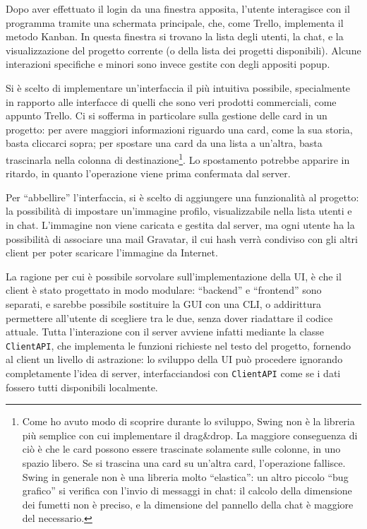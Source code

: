 \documentclass[a4paper,11pt] {article}
\begin{document}
Dopo aver effettuato il login da una finestra apposita, l'utente interagisce con il programma tramite una schermata principale, che, come Trello, implementa il metodo Kanban. In questa finestra si trovano la lista degli utenti, la chat, e la visualizzazione del progetto corrente (o della lista dei progetti disponibili). Alcune interazioni specifiche e minori sono invece gestite con degli appositi popup.

Si è scelto di implementare un'interfaccia il più intuitiva possibile, specialmente in rapporto alle interfacce di quelli che sono veri prodotti commerciali, come appunto Trello. Ci si sofferma in particolare sulla gestione delle card in un progetto: per avere maggiori informazioni riguardo una card, come la sua storia, basta cliccarci sopra; per spostare una card da una lista a un'altra, basta trascinarla nella colonna di destinazione\footnote{Come ho avuto modo di scoprire durante lo sviluppo, Swing non è la libreria più semplice con cui implementare il drag\&drop. La maggiore conseguenza di ciò è che le card possono essere trascinate solamente sulle colonne, in uno spazio libero. Se si trascina una card su un'altra card, l'operazione fallisce.\\Swing in generale non è una libreria molto ``elastica'': un altro piccolo ``bug grafico'' si verifica con l'invio di messaggi in chat: il calcolo della dimensione dei fumetti non è preciso, e la dimensione del pannello della chat è maggiore del necessario.}. Lo spostamento potrebbe apparire in ritardo, in quanto l'operazione viene prima confermata dal server.

Per ``abbellire'' l'interfaccia, si è scelto di aggiungere una funzionalità al progetto: la possibilità di impostare un'immagine profilo, visualizzabile nella lista utenti e in chat. L'immagine non viene caricata e gestita dal server, ma ogni utente ha la possibilità di associare una mail Gravatar, il cui hash verrà condiviso con gli altri client per poter scaricare l'immagine da Internet.

La ragione per cui è possibile sorvolare sull'implementazione della UI, è che il client è stato progettato in modo modulare: ``backend'' e ``frontend'' sono separati, e sarebbe possibile sostituire la GUI con una CLI, o addirittura permettere all'utente di scegliere tra le due, senza dover riadattare il codice attuale.
Tutta l'interazione con il server avviene infatti mediante la classe \texttt{ClientAPI}, che implementa le funzioni richieste nel testo del progetto, fornendo al client un livello di astrazione: lo sviluppo della UI può procedere ignorando completamente l'idea di server, interfacciandosi con \texttt{ClientAPI} come se i dati fossero tutti disponibili localmente.
\end{document}
